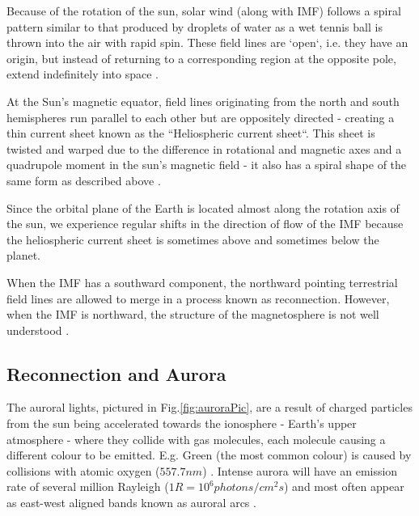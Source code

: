 \documentclass[12pt]{article}
\begin{document}
Because of the rotation of the sun, solar wind (along with IMF) follows a spiral pattern similar to that produced by droplets of water as a wet tennis ball is thrown into the air with rapid spin. These field lines are `open`, i.e. they have an origin, but instead of returning to a corresponding region at the opposite pole, extend indefinitely into space \cite{imfUptoLat16}. 

At the Sun's magnetic equator, field lines originating from the north and south hemispheres run parallel to each other but are oppositely directed - creating a thin current sheet known as the ``Heliospheric current sheet``. This sheet is twisted and warped due to the difference in rotational and magnetic axes and a quadrupole moment in the sun's magnetic field - it also has a spiral shape of the same form as described above \cite{alfven_1942, ParkerSpiral}.

Since the orbital plane of the Earth is located almost along the rotation axis of the sun, we experience regular shifts in the direction of flow of the IMF because the heliospheric current sheet is sometimes above and sometimes below the planet. 

When the IMF has a southward component, the northward pointing terrestrial field lines are allowed to merge in a process known as reconnection. However, when the IMF is northward, the structure of the magnetosphere is not well understood \cite{Fear1506}.

\subsection{Reconnection and Aurora}
The auroral lights, pictured in Fig.\ref{fig:auroraPic}, are a result of charged particles from the sun being accelerated towards the ionosphere - Earth's upper atmosphere - where they collide with gas molecules, each molecule causing a different colour to be emitted. 
E.g. Green (the most common colour) is caused by collisions with atomic oxygen ($557.7 nm$) \cite{hollier, BSPP}. Intense aurora will have an emission rate of several million Rayleigh ($1R=10^6 photons/cm^2s$) and most often appear as east-west aligned bands known as auroral arcs \cite{BSPP}.
\end{document}
